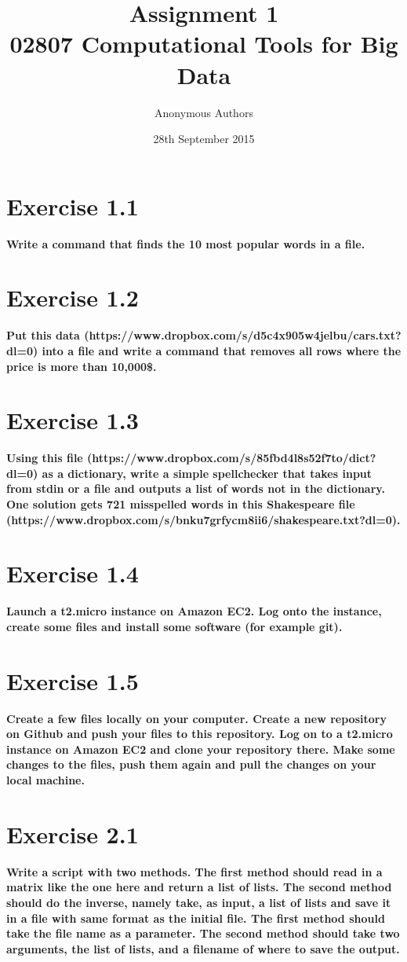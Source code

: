 \documentclass{article}
\title{Assignment 1\\02807 Computational Tools for Big Data}
\author{Anonymous Authors}
\date{28th September 2015}
\begin{document}
\maketitle

\section{Exercise 1.1}
\textbf{Write a command that finds the 10 most popular words in a file.}


\section{Exercise 1.2}
\textbf{Put this data (https://www.dropbox.com/s/d5c4x905w4jelbu/cars.txt?dl=0) into a file and write a command that removes all rows where the price is more than 10,000\$.}


\section{Exercise 1.3}
\textbf{Using this file (https://www.dropbox.com/s/85fbd4l8s52f7to/dict?dl=0) as a dictionary, write a simple spellchecker that takes input from stdin or a file and outputs a list of words not in the dictionary. One solution gets 721 misspelled words in this Shakespeare file (https://www.dropbox.com/s/bnku7grfycm8ii6/shakespeare.txt?dl=0).}



\section{Exercise 1.4}
\textbf{Launch a t2.micro instance on Amazon EC2. Log onto the instance, create some files and install some software (for example git).}
\section{Exercise 1.5}
\textbf{Create a few files locally on your computer. Create a new repository on Github and push your files to this repository. Log on to a t2.micro instance on Amazon EC2 and clone your repository there. Make some changes to the files, push them again and pull the changes on your local machine.}

\section{Exercise 2.1}
\textbf{Write a script with two methods. The first method should read in a matrix like the one here and return a list of lists. The second method should do the inverse, namely take, as input, a list of lists and save it in a file with same format as the initial file. The first method should take the file name as a parameter. The second method should take two arguments, the list of lists, and a filename of where to save the output.}

\end{document}
